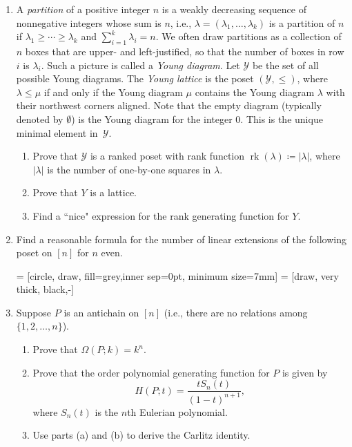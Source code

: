 \documentclass[11pt]{article}%
\theoremstyle{definition}
\DeclareMathOperator{\rk}{rk}
\begin{document}
\begin{enumerate}

\item A \emph{partition} of a positive integer $n$ is a weakly decreasing sequence of nonnegative integers whose sum is $n$, i.e., $\lambda = (\lambda_1,\ldots,\lambda_k)$ is a partition of $n$ if $\lambda_1\geq\cdots\geq \lambda_k$ and $\sum_{i=1}^k \lambda_i = n$. We often draw partitions as a collection of $n$ boxes that are upper- and left-justified, so that the number of boxes in row $i$ is $\lambda_i$. Such a picture is called a \emph{Young diagram}. Let $\mathcal{Y}$ be the set of all possible Young diagrams. The \emph{Young lattice} is the poset $(\mathcal{Y},\leq)$, where $\lambda\leq \mu$ if and only if the Young diagram $\mu$ contains the Young diagram $\lambda$ with their northwest corners aligned. Note that the empty diagram (typically denoted by $\emptyset$) is the Young diagram for the integer 0. This is the unique minimal element in~$\mathcal{Y}$.
\begin{enumerate}
\item Prove that $\mathcal{Y}$ is a ranked poset with rank function $\rk(\lambda)\coloneqq |\lambda|$, where $|\lambda|$ is the number of one-by-one squares in $\lambda$.
\item Prove that $Y$ is a lattice.
\item Find a ``nice" expression for the rank generating function for $Y$.
\end{enumerate} 

\item Find a reasonable formula for the number of linear extensions of the following poset on $[n]$ for $n$ even.

 = [circle, draw, fill=grey,inner sep=0pt, minimum size=7mm]
 = [draw, very thick, black,-]

\begin{center}
\end{center}

\item Suppose $P$ is an antichain on $[n]$ (i.e., there are no relations among $\{1,2,\ldots,n\}$).
\begin{enumerate}
\item Prove that $\Omega(P;k)=k^n$.
\item Prove that the order polynomial generating function for $P$ is given by
\[
H(P;t)=\frac{tS_n(t)}{(1-t)^{n+1}},
\]
where $S_n(t)$ is the $n$th Eulerian polynomial.
\item Use parts (a) and (b) to derive the Carlitz identity.
\end{enumerate}


\end{enumerate}
\end{document}
